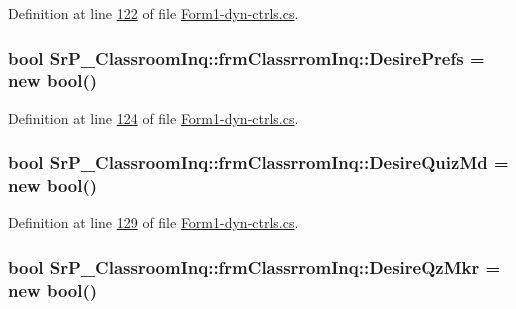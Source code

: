 \-Definition at line \hyperlink{_form1-dyn-ctrls_8cs_source_l00122}{122} of file \hyperlink{_form1-dyn-ctrls_8cs_source}{\-Form1-\/dyn-\/ctrls.\-cs}.

\hypertarget{class_sr_p___classroom_inq_1_1frm_classrrom_inq_a263bbbace2f9c25e5f92573e5f4845ba}{
\subsubsection[{\-Desire\-Prefs}]{\setlength{\rightskip}{0pt plus 5cm}bool {\bf \-Sr\-P\-\_\-\-Classroom\-Inq\-::frm\-Classrrom\-Inq\-::\-Desire\-Prefs} = new bool()}}
\label{class_sr_p___classroom_inq_1_1frm_classrrom_inq_a263bbbace2f9c25e5f92573e5f4845ba}


\-Definition at line \hyperlink{_form1-dyn-ctrls_8cs_source_l00124}{124} of file \hyperlink{_form1-dyn-ctrls_8cs_source}{\-Form1-\/dyn-\/ctrls.\-cs}.

\hypertarget{class_sr_p___classroom_inq_1_1frm_classrrom_inq_afe88ba4ba5644eaceb0edd49fa307c61}{
\subsubsection[{\-Desire\-Quiz\-Md}]{\setlength{\rightskip}{0pt plus 5cm}bool {\bf \-Sr\-P\-\_\-\-Classroom\-Inq\-::frm\-Classrrom\-Inq\-::\-Desire\-Quiz\-Md} = new bool()}}
\label{class_sr_p___classroom_inq_1_1frm_classrrom_inq_afe88ba4ba5644eaceb0edd49fa307c61}


\-Definition at line \hyperlink{_form1-dyn-ctrls_8cs_source_l00129}{129} of file \hyperlink{_form1-dyn-ctrls_8cs_source}{\-Form1-\/dyn-\/ctrls.\-cs}.

\hypertarget{class_sr_p___classroom_inq_1_1frm_classrrom_inq_a6be0280a203b7fa9cfda5d8d1703d81a}{
\subsubsection[{\-Desire\-Qz\-Mkr}]{\setlength{\rightskip}{0pt plus 5cm}bool {\bf \-Sr\-P\-\_\-\-Classroom\-Inq\-::frm\-Classrrom\-Inq\-::\-Desire\-Qz\-Mkr} = new bool()}}
\label{class_sr_p___classroom_inq_1_1frm_classrrom_inq_a6be0280a203b7fa9cfda5d8d1703d81a}


